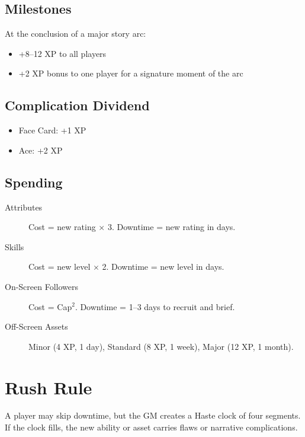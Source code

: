 \subsection{Milestones}

At the conclusion of a major story arc:
\begin{itemize}
\item +8--12 XP to all players
\item +2 XP bonus to one player for a signature moment of the arc
\end{itemize}

\subsection{Complication Dividend}
\begin{itemize}
    \item Face Card: +1 XP
    \item Ace: +2 XP
\end{itemize}

\subsection{Spending}

\begin{description}
\item[Attributes] Cost = new rating $\times$ 3. Downtime = new rating in days.
\item[Skills] Cost = new level $\times$ 2. Downtime = new level in days.
\item[On-Screen Followers] Cost = Cap$^2$. Downtime = 1--3 days to recruit and brief.
\item[Off-Screen Assets] Minor (4 XP, 1 day), Standard (8 XP, 1 week), Major (12 XP, 1 month).
\end{description}

\section{Rush Rule}
A player may skip downtime, but the GM creates a Haste clock of four segments. If the clock fills, the new ability or asset carries flaws or narrative complications.

